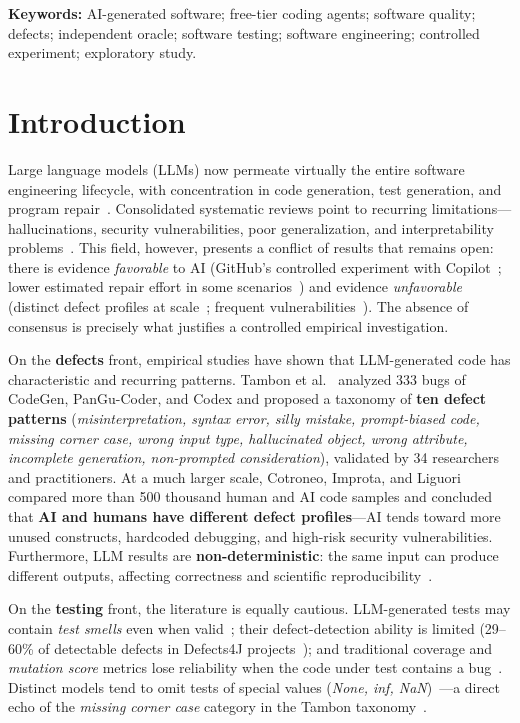 \documentclass[11pt]{article}
\begin{document}
\noindent\textbf{Keywords:} AI-generated software; free-tier coding agents; software quality; defects; independent oracle; software testing; software engineering; controlled experiment; exploratory study.

\tableofcontents

\section{Introduction}\label{sec:intro}

Large language models (LLMs) now permeate virtually the entire software engineering lifecycle, with concentration in code generation, test generation, and program repair~\cite{A01}. Consolidated systematic reviews point to recurring limitations---hallucinations, security vulnerabilities, poor generalization, and interpretability problems~\cite{A02}. This field, however, presents a conflict of results that remains open: there is evidence \emph{favorable} to AI (GitHub's controlled experiment with Copilot~\cite{D03}; lower estimated repair effort in some scenarios~\cite{D02}) and evidence \emph{unfavorable} (distinct defect profiles at scale~\cite{B03}; frequent vulnerabilities~\cite{E01,E02,E03}). The absence of consensus is precisely what justifies a controlled empirical investigation.

On the \textbf{defects} front, empirical studies have shown that LLM-generated code has characteristic and recurring patterns. Tambon et al.~\cite{B01} analyzed 333 bugs of CodeGen, PanGu-Coder, and Codex and proposed a taxonomy of \textbf{ten defect patterns} (\emph{misinterpretation, syntax error, silly mistake, prompt-biased code, missing corner case, wrong input type, hallucinated object, wrong attribute, incomplete generation, non-prompted consideration}), validated by 34 researchers and practitioners. At a much larger scale, Cotroneo, Improta, and Liguori~\cite{B03} compared more than 500 thousand human and AI code samples and concluded that \textbf{AI and humans have different defect profiles}---AI tends toward more unused constructs, hardcoded debugging, and high-risk security vulnerabilities. Furthermore, LLM results are \textbf{non-deterministic}: the same input can produce different outputs, affecting correctness and scientific reproducibility~\cite{B04}.

On the \textbf{testing} front, the literature is equally cautious. LLM-generated tests may contain \emph{test smells} even when valid~\cite{C03}; their defect-detection ability is limited (29--60\% of detectable defects in Defects4J projects~\cite{C04}); and traditional coverage and \emph{mutation score} metrics lose reliability when the code under test contains a bug~\cite{C05}. Distinct models tend to omit tests of special values (\emph{None, inf, NaN})~\cite{C06}---a direct echo of the \emph{missing corner case} category in the Tambon taxonomy~\cite{B01}.
\end{document}
